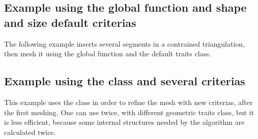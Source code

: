 \subsection{Example using the global function and shape and size default
  criterias}

The following example inserts several segments in a contrained
triangulation, then mesh it using the global function
 and the default traits class.


\subsection{Example using the class  and several
  criterias}

This example uses the class  in order to refine
the mesh with new criterias, after the first meshing. One can use
 twice, with different geometric traits class,
but it is less efficient, because some internal structures needed by the
algorithm are calculated twice.




